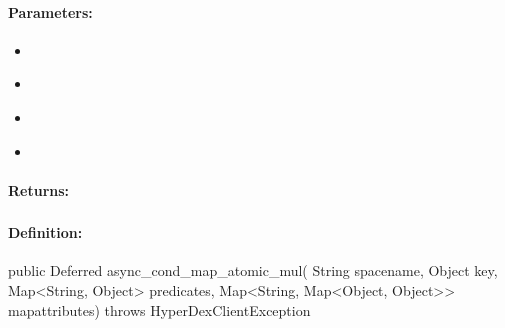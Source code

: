 \paragraph{Parameters:}
\begin{itemize}[noitemsep]
\item {}\\

\item {}\\

\item {}\\

\item {}\\

\end{itemize}

\paragraph{Returns:}


\pagebreak
\subsubsection{}
\label{api:java:async_cond_map_atomic_mul}


\paragraph{Definition:}
\begin{javacode}
public Deferred async_cond_map_atomic_mul(
        String spacename,
        Object key,
        Map<String, Object> predicates,
        Map<String, Map<Object, Object>> mapattributes) throws HyperDexClientException
\end{javacode}

